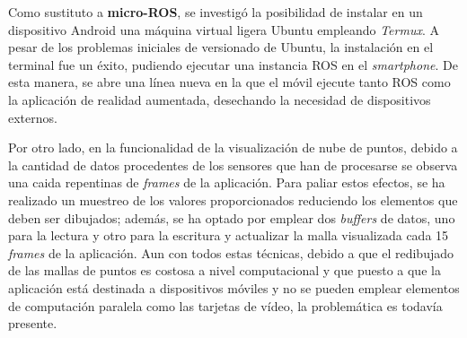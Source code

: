 Como sustituto a \textbf{micro-ROS}, se investigó la posibilidad de instalar en un dispositivo Android una 
máquina virtual ligera Ubuntu empleando \textit{Termux}. A pesar de los problemas iniciales de versionado de Ubuntu, la 
instalación en el terminal fue un éxito, pudiendo ejecutar una instancia ROS en el \textit{smartphone}. De esta manera, 
se abre una línea nueva en la que el móvil ejecute tanto ROS como la aplicación de realidad aumentada, desechando la necesidad
de dispositivos externos.

Por otro lado, en la funcionalidad de la visualización de nube de puntos, debido a la cantidad de datos procedentes de los sensores 
que han de procesarse se observa una caida repentinas de \textit{frames} de la aplicación. Para paliar estos efectos, se ha realizado
un muestreo de los valores proporcionados reduciendo los elementos que deben ser dibujados; además, se ha optado por emplear dos \textit{buffers} de 
datos, uno para la lectura y otro para la escritura y actualizar la malla visualizada cada 15 \textit{frames} de la aplicación. 
Aun con todos estas técnicas, debido a que el redibujado de las mallas de puntos es costosa a nivel computacional y que puesto a que la aplicación está 
destinada a dispositivos móviles y no se pueden emplear elementos de computación paralela como las tarjetas de vídeo, la problemática es todavía presente.

